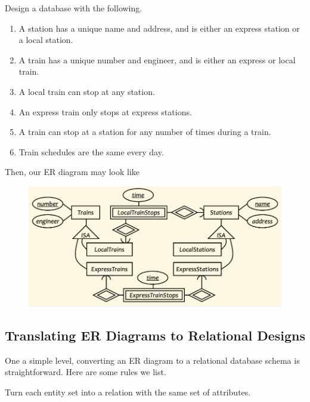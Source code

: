 \documentclass{article}
\begin{document}
    \begin{example}
      Design a database with the following. 
      \begin{enumerate}
        \item A station has a unique name and address, and is either an express station or a local station. 
        \item A train has a unique number and engineer, and is either an express or local train. 
        \item A local train can stop at any station. 
        \item An express train only stops at express stations. 
        \item A train can stop at a station for any number of times during a train. 
        \item Train schedules are the same every day. 
      \end{enumerate}
      Then, our ER diagram may look like 
      \begin{figure}[H]
        \centering 
        \includegraphics[scale=0.4]{img/train1.png}
        \caption{} 
        \label{fig:train1}
      \end{figure}
      
    \end{example}

  \subsection{Translating ER Diagrams to Relational Designs}

    One a simple level, converting an ER diagram to a relational database schema is straightforward. Here are some rules we list. 

    \begin{theorem}
      Turn each entity set into a relation with the same set of attributes. 
    \end{theorem}
\end{document}
